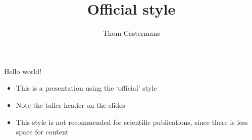 \documentclass[12pt, aspectratio=169]{beamer} %
\title{Official style}
\author{Thom Castermans}
\begin{document}
\begin{titleframe}
\end{titleframe}

\begin{frame}{Hello world!}
  \begin{itemize}
    \item This is a presentation using the `official' style
    \item Note the taller header on the slides
    \item This style is not recommended for scientific publications, since there is less space for content
  \end{itemize}
\end{frame}
\end{document}
